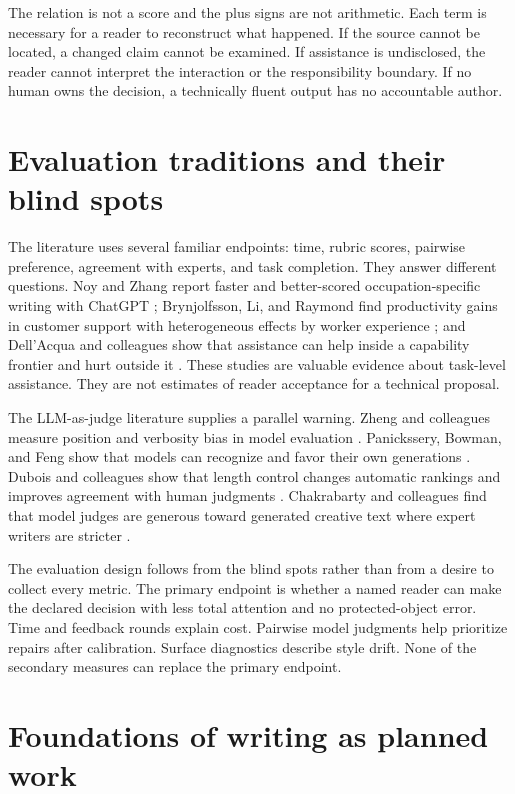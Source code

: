 The relation is not a score and the plus signs are not arithmetic. Each term is
necessary for a reader to reconstruct what happened. If the source cannot be
located, a changed claim cannot be examined. If assistance is undisclosed,
the reader cannot interpret the interaction or the responsibility boundary. If
no human owns the decision, a technically fluent output has no accountable
author.

\section{Evaluation traditions and their blind spots}
\label{sec:lit-evaluation-traditions}

The literature uses several familiar endpoints: time, rubric scores, pairwise
preference, agreement with experts, and task completion. They answer different
questions. Noy and Zhang report faster and better-scored occupation-specific
writing with ChatGPT \citep{noy2023experimental}; Brynjolfsson, Li, and
Raymond find productivity gains in customer support with heterogeneous effects
by worker experience \citep{brynjolfsson2025work}; and Dell'Acqua and
colleagues show that assistance can help inside a capability frontier and hurt
outside it \citep{dellacqua2026jagged}. These studies are valuable evidence
about task-level assistance. They are not estimates of reader acceptance for a
technical proposal.

The LLM-as-judge literature supplies a parallel warning. Zheng and colleagues
measure position and verbosity bias in model evaluation
\citep{zheng2023judging}. Panickssery, Bowman, and Feng show that models can
recognize and favor their own generations \citep{panickssery2024llm}. Dubois
and colleagues show that length control changes automatic rankings and improves
agreement with human judgments \citep{dubois2024length}. Chakrabarty and
colleagues find that model judges are generous toward generated creative text
where expert writers are stricter \citep{chakrabarty2024art}.

The evaluation design follows from the blind spots rather than from a desire
to collect every metric. The primary endpoint is whether a named reader can
make the declared decision with less total attention and no protected-object
error. Time and feedback rounds explain cost. Pairwise model judgments help
prioritize repairs after calibration. Surface diagnostics describe style drift.
None of the secondary measures can replace the primary endpoint.

\section{Foundations of writing as planned work}
\label{sec:lit-writing-foundations}

